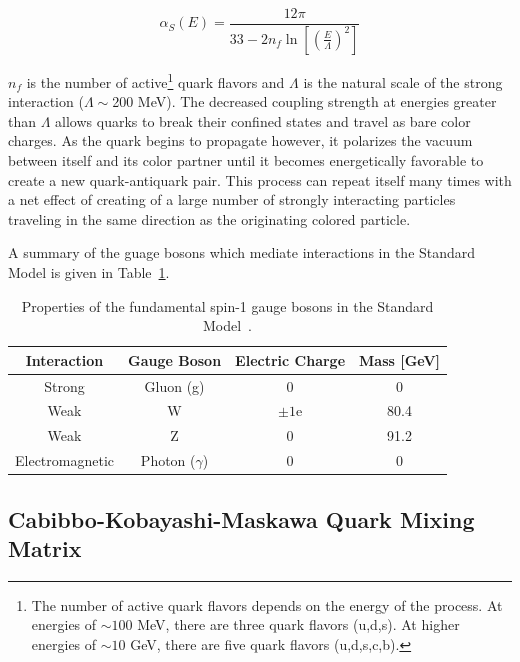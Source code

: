 \begin{equation}
\label{alphas}
\alpha_{S}(E) = \frac{12\pi}{33-2n_{f}\ln\left[\left(\frac{E}{\Lambda}\right)^{2}\right]}
\end{equation}

\noindent $n_{f}$ is the number of active\footnote{The number of active quark flavors depends on the energy of the process. At energies of $\sim100$ MeV, there are three quark flavors (u,d,s). At higher energies of $\sim10$ GeV, there are five quark flavors (u,d,s,c,b).} quark flavors and $\Lambda$ is the natural scale of the strong interaction ($\Lambda\sim$200 MeV).
The decreased coupling strength at energies greater than $\Lambda$ allows quarks to break their confined states and travel as bare color charges. As the quark begins to propagate however, it polarizes the vacuum between itself and its color partner until it becomes energetically favorable to create a new quark-antiquark pair. This process can repeat itself many times with a net effect of creating of a large number of strongly interacting particles traveling in the same direction as the originating colored particle. 

A summary of the guage bosons which mediate interactions in the Standard Model is given in Table~\ref{bosons}.

\begin{table}[!h!tbp]
\begin{center}
\caption{Properties of the fundamental spin-1 gauge bosons in the Standard Model~\cite{Yao:2006px}.}
\label{bosons}
\begin{tabular}{c|ccc}
Interaction		&	Gauge Boson		&	Electric Charge		&	Mass [GeV] \\
\hline
Strong			&	Gluon (g)			&	0				&	0	\\
Weak			&	W				&	$\pm 1$e			&	80.4	\\
Weak			&	Z				&	0				&	91.2	\\
Electromagnetic	&	Photon ($\gamma$)	&	0				&	0	\\
\end{tabular}
\vspace{-0.1 in}
\end{center}
\end{table}
\subsection{Cabibbo-Kobayashi-Maskawa Quark Mixing Matrix}

